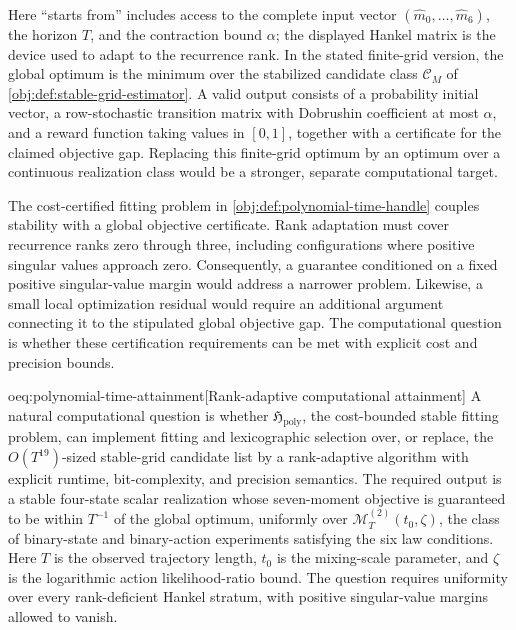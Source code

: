 Here ``starts from'' includes access to the complete input vector \((\widehat m_0,\ldots,\widehat m_6)\), the horizon \(T\), and the contraction bound \(\alpha\); the displayed Hankel matrix is the device used to adapt to the recurrence rank. In the stated finite-grid version, the global optimum is the minimum over the stabilized candidate class \(\mathcal C_M\) of \cref{obj:def:stable-grid-estimator}. A valid output consists of a probability initial vector, a row-stochastic transition matrix with Dobrushin coefficient at most \(\alpha\), and a reward function taking values in \([0,1]\), together with a certificate for the claimed objective gap. Replacing this finite-grid optimum by an optimum over a continuous realization class would be a stronger, separate computational target.

The cost-certified fitting problem  in \cref{obj:def:polynomial-time-handle} couples stability with a global objective certificate. Rank adaptation must cover recurrence ranks zero through three, including configurations where positive singular values approach zero. Consequently, a guarantee conditioned on a fixed positive singular-value margin would address a narrower problem. Likewise, a small local optimization residual would require an additional argument connecting it to the stipulated global objective gap. The computational question is whether these certification requirements can be met with explicit cost and precision bounds.

\begin{remarkv}{oeq:polynomial-time-attainment}[Rank-adaptive computational attainment]
A natural computational question is whether \(\mathfrak H_{\mathrm{poly}}\), the cost-bounded stable fitting problem, can implement fitting and lexicographic selection over, or replace, the \(O(T^{19})\)-sized stable-grid candidate list by a rank-adaptive algorithm with explicit runtime, bit-complexity, and precision semantics. The required output is a stable four-state scalar realization whose seven-moment objective is guaranteed to be within \(T^{-1}\) of the global optimum, uniformly over \(\mathcal M_T^{(2)}(t_0,\zeta)\), the class of binary-state and binary-action experiments satisfying the six law conditions. Here \(T\) is the observed trajectory length, \(t_0\) is the mixing-scale parameter, and \(\zeta\) is the logarithmic action likelihood-ratio bound. The question requires uniformity over every rank-deficient Hankel stratum, with positive singular-value margins allowed to vanish.
\end{remarkv}

